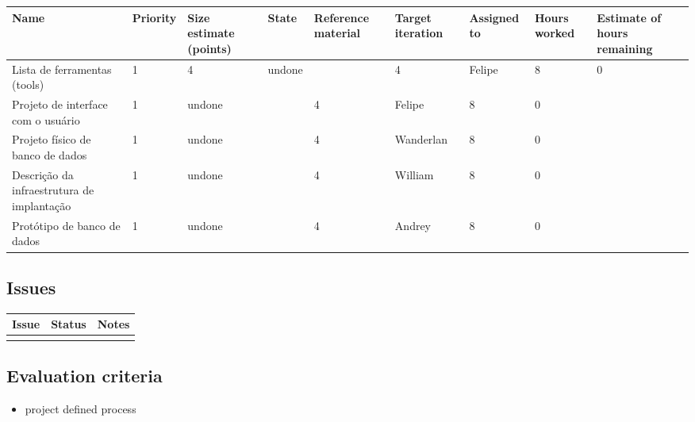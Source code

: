 \begin{adjustbox}{width=\textwidth}
\noindent\begin{tabular}{|l|l|l|l|l|l|l|l|l|}
\hline
Name & Priority & Size estimate (points) & State & Reference material & Target iteration & Assigned to & Hours worked & Estimate of hours remaining \\ \hline
Lista de ferramentas (tools) &  1 & 4 & undone & & 4 & Felipe & 8 & 0 \\ \hline
Projeto de interface com o usuário & 1 & undone & & 4 & Felipe & 8 & 0 \\ \hline
Projeto físico de banco de dados & 1 & undone & & 4 & Wanderlan & 8 & 0 \\ \hline
Descrição da infraestrutura de implantação & 1 & undone & & 4 & William & 8 & 0 \\ \hline
Protótipo de banco de dados & 1 & undone & & 4 & Andrey & 8 & 0 \\ \hline

\end{tabular}
\end{adjustbox}

\subsection*{Issues}


\noindent\begin{tabular}{|l|l|l|}
\hline
Issue & Status & Notes \\
\hline
 &  & \\
\hline
\end{tabular}

\subsection*{Evaluation criteria}


\begin{itemize}
	\item project defined process
\end{itemize}

